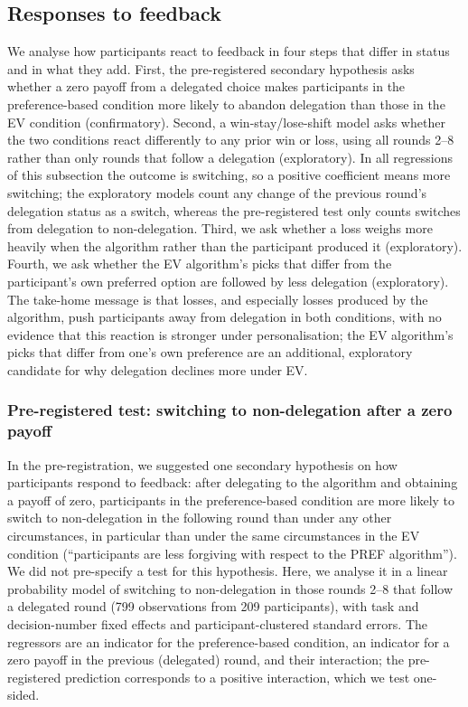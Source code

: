 \documentclass[a4paper, 12pt, fleqn]{article}
\theoremstyle{hypstyle}
\begin{document}
\subsection{Responses to feedback}\label{sec:feedback}
We analyse how participants react to feedback in four steps that differ in status and in what they add. First, the pre-registered secondary hypothesis asks whether a zero payoff from a delegated choice makes participants in the preference-based condition more likely to abandon delegation than those in the EV condition (confirmatory). Second, a win-stay/lose-shift model asks whether the two conditions react differently to any prior win or loss, using all rounds 2--8 rather than only rounds that follow a delegation (exploratory). In all regressions of this subsection the outcome is switching, so a positive coefficient means more switching; the exploratory models count any change of the previous round's delegation status as a switch, whereas the pre-registered test only counts switches from delegation to non-delegation. Third, we ask whether a loss weighs more heavily when the algorithm rather than the participant produced it (exploratory). Fourth, we ask whether the EV algorithm's picks that differ from the participant's own preferred option are followed by less delegation (exploratory). The take-home message is that losses, and especially losses produced by the algorithm, push participants away from delegation in both conditions, with no evidence that this reaction is stronger under personalisation; the EV algorithm's picks that differ from one's own preference are an additional, exploratory candidate for why delegation declines more under EV.

\subsubsection*{Pre-registered test: switching to non-delegation after a zero payoff}
In the pre-registration, we suggested one secondary hypothesis on how participants respond to feedback: after delegating to the algorithm and obtaining a payoff of zero, participants in the preference-based condition are more likely to switch to non-delegation in the following round than under any other circumstances, in particular than under the same circumstances in the EV condition (``participants are less forgiving with respect to the PREF algorithm''). We did not pre-specify a test for this hypothesis. Here, we analyse it in a linear probability model of switching to non-delegation in those rounds 2--8 that follow a delegated round (799 observations from 209 participants), with task and decision-number fixed effects and participant-clustered standard errors. The regressors are an indicator for the preference-based condition, an indicator for a zero payoff in the previous (delegated) round, and their interaction; the pre-registered prediction corresponds to a positive interaction, which we test one-sided.
\end{document}

